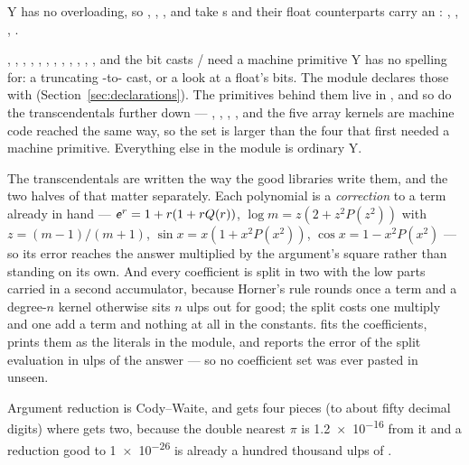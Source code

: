 Y has no overloading, so , , ,  and 
take s and their float counterparts carry an : ,
, , .

, , , ,
, , , ,
, , , ,
 and the bit casts  /
 need a machine primitive Y has no spelling for: a truncating
-to- cast, or a look at a float's bits. The module declares
those with  (Section~\ref{sec:declarations}). The
primitives behind them live in , and so do the
transcendentals further down --- , , , , 
and the five array kernels are machine code reached the same way, so the set
is larger than the four that first needed a machine primitive. Everything
else in the module is ordinary Y.

The transcendentals are written the way the good libraries write them, and the
two halves of that matter separately. Each polynomial is a \emph{correction} to a
term already in hand --- $\textsf{\textit{e}}^r = 1 + r(1 + rQ(r))$,
$\log m = z(2 + z^2P(z^2))$ with $z = (m-1)/(m+1)$, $\sin x = x(1 + x^2P(x^2))$,
$\cos x = 1 - x^2P(x^2)$ --- so its error reaches the answer multiplied by the
argument's square rather than standing on its own. And every coefficient is split
in two with the low parts carried in a second accumulator, because Horner's rule
rounds once a term and a degree-$n$ kernel otherwise sits $n$ ulps out for good;
the split costs one multiply and one add a term and nothing at all in the
constants.  fits the coefficients, prints them as
the literals in the module, and reports the error of the split evaluation in ulps
of the answer --- so no coefficient set was ever pasted in unseen.

Argument reduction is Cody--Waite, and  gets four pieces (to about
fifty decimal digits) where  gets two, because the double nearest
$\pi$ is \num{1.2e-16} from it and a reduction good to \num{1e-26} is already a
hundred thousand ulps of .


